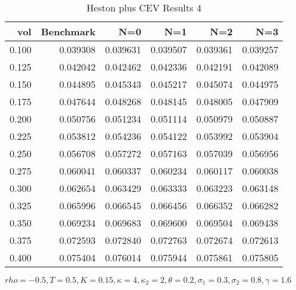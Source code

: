 \begin{table}[ht]
  \centering
  \caption{Heston plus CEV Results 4}
  \begin{tabular}{rrrrrr}
  \toprule
    vol &       Benchmark &       N=0 &       N=1 &       N=2 &       N=3 \\
  \midrule
  0.100 & 0.039308 & 0.039631 & 0.039507 & 0.039361 & 0.039257 \\
  0.125 & 0.042042 & 0.042462 & 0.042336 & 0.042191 & 0.042089 \\
  0.150 & 0.044895 & 0.045343 & 0.045217 & 0.045074 & 0.044975 \\
  0.175 & 0.047644 & 0.048268 & 0.048145 & 0.048005 & 0.047909 \\
  0.200 & 0.050756 & 0.051234 & 0.051114 & 0.050979 & 0.050887 \\
  0.225 & 0.053812 & 0.054236 & 0.054122 & 0.053992 & 0.053904 \\
  0.250 & 0.056708 & 0.057272 & 0.057163 & 0.057039 & 0.056956 \\
  0.275 & 0.060041 & 0.060337 & 0.060234 & 0.060117 & 0.060038 \\
  0.300 & 0.062654 & 0.063429 & 0.063333 & 0.063223 & 0.063148 \\
  0.325 & 0.065996 & 0.066545 & 0.066456 & 0.066352 & 0.066282 \\
  0.350 & 0.069234 & 0.069683 & 0.069600 & 0.069504 & 0.069438 \\
  0.375 & 0.072593 & 0.072840 & 0.072763 & 0.072674 & 0.072613 \\
  0.400 & 0.075404 & 0.076014 & 0.075944 & 0.075861 & 0.075805 \\
  \bottomrule
  \end{tabular}
  \small{$rho = -0.5,T=0.5,K=0.15, \kappa = 4, \kappa_2 =2, \theta =0.2, \sigma_1 =0.3, \sigma_2 = 0.8, \gamma = 1.6$}
  \end{table}

